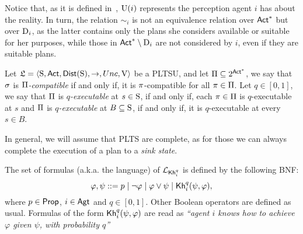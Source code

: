 Notice that, as it is defined in~\cite{AFSVQ21,AFSVQ23}, $\Unc(i)$ represents the perception agent $i$ has about the reality. In turn, the relation $\sim_i$ is not an equivalence relation over $\ACT^*$ but over $\DS{i}$, as the latter contains only the plans she considers available or suitable for her purposes, while those in $\ACT^*\setminus\DS{i}$ are not considered by $i$, even if they are suitable plans. 



\begin{definition}\label{def:comp-exec-sets}
    Let $\model=\tup{\S,\ACT,\dist(\S),\ra,Unc,\V}$ be a PLTSU, and let $\plans\subseteq 2^{\ACT^*}$, we say that $\strategy$ is \emph{$\plans$-compatible} if and only if, it is $\plan$-compatible for all $\plan\in\plans$. 
    Let $q\in[0,1]$, we say that $\plans$ is \emph{$q$-executable} at $s\in\S$, if and only if, each $\plan\in\plans$ is $q$-executable at $s$ and $\plans$ is \emph{$q$-executable} at $B\subseteq\S$, if and only if, it is $q$-executable at every $s\in B$.
\end{definition}

In general, we will assume that PLTS are complete, as for those we can always complete the execution of a plan to a \emph{sink state}.

\begin{definition}
    \label{def:syntax}
    The set of formulas (a.k.a. the language) of $\PKhunc$ is defined by the following BNF:
    \[
        \varphi, \psi ::= p \mid \neg \varphi \mid \varphi \vee \psi \mid \kh_i^q(\psi,\varphi),
    \]
    where $p\in\PROP$, $i\in\AGT$ and $q\in[0,1]$. Other Boolean operators are defined as usual. Formulas of the form $\kh_i^q(\psi,\varphi)$ are read as \emph{``agent $i$ knows how to achieve $\varphi$ given $\psi$, with probability $q$''}
\end{definition}

